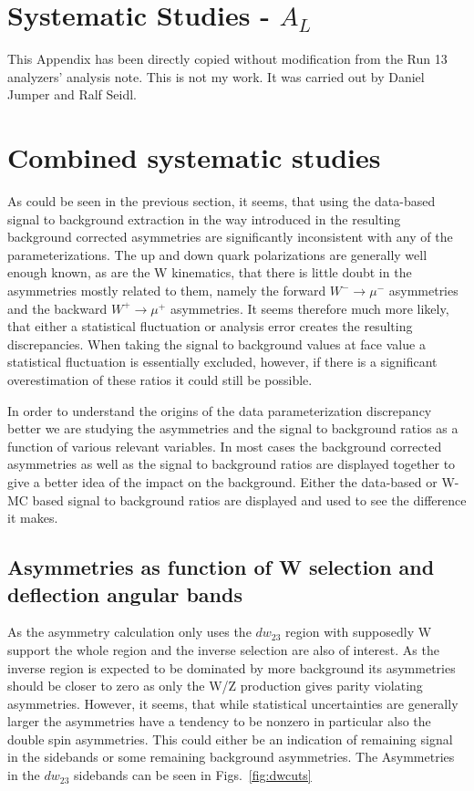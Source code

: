 \appendix

\section{Systematic Studies - $A_L$}
\label{appendix_1}

This Appendix has been directly copied without modification from the Run 13
analyzers' analysis note. This is not my work. It was carried out by Daniel
Jumper and Ralf Seidl.

\section{Combined systematic studies}
As could be seen in the previous section, it seems, that using the data-based
signal to background extraction in the way introduced in \cite{oide} the
resulting background corrected asymmetries are significantly inconsistent with
any of the parameterizations. The up and down quark polarizations are generally
well enough known, as are the W kinematics, that there is little doubt in the
asymmetries mostly related to them, namely the forward $W^-\rightarrow \mu^-$
asymmetries and the backward $W^+\rightarrow\mu^+$ asymmetries. It seems
therefore much more likely, that either a statistical fluctuation or analysis
error creates the resulting discrepancies. When taking the signal to background
values at face value a statistical fluctuation is essentially excluded, however,
if there is a significant overestimation of these ratios it could still be
possible. 

In order to understand the origins of the data parameterization discrepancy
better we are studying the asymmetries and the signal to background ratios as a
function of various relevant variables. In most cases the background corrected
asymmetries as well as the signal to background ratios are displayed together to
give a better idea of the impact on the background. Either the data-based or
W-MC based signal to background ratios are displayed and used to see the
difference it makes.

\subsection{Asymmetries as function of W selection and deflection angular bands}

As the asymmetry calculation only uses the $dw_{23}$ region with supposedly W support
the whole region and the inverse selection are also of interest. As the inverse
region is expected to be dominated by more background its asymmetries should be
closer to zero as only the W/Z production gives parity violating asymmetries.
However, it seems, that while statistical uncertainties are generally larger the
asymmetries have a tendency to be nonzero in particular also the double spin
asymmetries. This could either be an indication of remaining signal in the
sidebands or some remaining background asymmetries. The Asymmetries in the
$dw_{23}$ sidebands can be seen in Figs.~\ref{fig:dwcuts}

